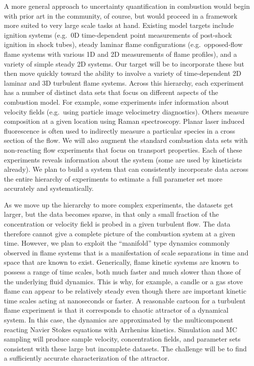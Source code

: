 \documentclass[11pt]{article}
\begin{document}
A more general approach to uncertainty quantification in combustion
would begin with prior art in the community, of course, but would
proceed in a framework more suited to very large scale tasks at hand.
Existing model targets include ignition systems (e.g.\ 0D
time-dependent point measurements of post-shock ignition in shock
tubes), steady laminar flame configurations (e.g.\ opposed-flow flame
systems with various 1D and 2D measurements of flame profiles), and a
variety of simple steady 2D systems.  Our target will be to incorporate
these but then move quickly toward the ability to involve a variety of
time-dependent 2D laminar and 3D turbulent flame systems.  Across this
hierarchy, each experiment has a number of distinct data sets that
focus on different aspects of the combustion model.  For example, some
experiments infer information about velocity fields (e.g.\ using
particle image velocimetry diagnostics). Others measure composition at
a given location using Raman spectroscopy. Planar laser induced
fluorescence is often used to indirectly measure a particular species
in a cross section of the flow.  We will also augment the standard
combustion data sets with non-reacting flow experiments that focus on
transport properties.  Each of these experiments reveals information
about the system (some are used by kineticists already).  We plan to
build a system that can consistently incorporate data across the
entire hierarchy of experiments to estimate a full parameter set more
accurately and systematically.

As we move up the hierarchy to more complex experiments, the datasets
get larger, but the data becomes sparse, in that only a small fraction
of the concentration or velocity field is probed in a given turbulent
flow.  The data therefore cannot give a complete picture of the
combustion system at a given time.  However, we plan to exploit the
``manifold'' type dynamics commonly observed in flame systems that is
a manifestation of scale separations in time and space that are known
to exist.  Generically, flame kinetic systems are known to possess a
range of time scales, both much faster and much slower than those of
the underlying fluid dynamics.  This is why, for example, a candle or
a gas stove flame can appear to be relatively steady even though there
are important kinetic time scales acting at nanoseconds or faster.  A
reasonable cartoon for a turbulent flame experiment is that it
corresponds to chaotic attractor of a dynamical system.  In this case,
the dynamics are approximated by the multicomponent reacting Navier
Stokes equations with Arrhenius kinetics.  Simulation and MC sampling
will produce sample velocity, concentration fields, and parameter sets
consistent with these large but incomplete datasets.  The challenge
will be to find a sufficiently accurate characterization of the
attractor.
\end{document}
